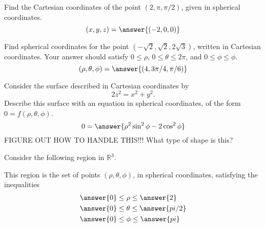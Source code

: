 \documentclass{ximera}
\begin{document}
\begin{problem}
Find the Cartesian coordinates of the point $(2, \pi, \pi/2)$, given in spherical coordinates.
\[
(x,y,z) = \answer{(-2,0,0)}
\]
\end{problem}

\begin{problem}
Find spherical coordinates for the point $\left(-\sqrt{2}, \sqrt{2}, 2\sqrt{3}\right)$, written in Cartesian coordinates. Your answer should satisfy $0\leq \rho$, $0\leq \theta \leq 2\pi$, and $0\leq \phi \leq \phi$.
\[
(\rho, \theta, \phi) = \answer{(4, 3\pi/4, \pi/6)}
\]
\end{problem}

\begin{problem}
Consider the surface described in Cartesian coordinates by
\[
2z^2 = x^2 +y^2.
\]
Describe this surface with an equation in spherical coordinates, of the form $0=f(\rho, \theta, \phi)$.
\[
0=\answer{\rho^2\sin^2\phi - 2\cos^2\phi}
\]
FIGURE OUT HOW TO HANDLE THIS!!!
What type of shape is this?
\begin{multipleChoice}
\end{multipleChoice}
\end{problem}

\begin{problem}
Consider the following region in $\mathbb{R}^3$.


This region is the set of points $(\rho,\theta,\phi)$, in spherical coordinates, satisfying the inequalities
\begin{align*}
&\answer{0}\leq\rho\leq \answer{2}\\
&\answer{0}\leq\theta\leq\answer{pi/2}\\
&\answer{0}\leq\phi\leq\answer{pi}
\end{align*}

\end{problem}
\end{document}
